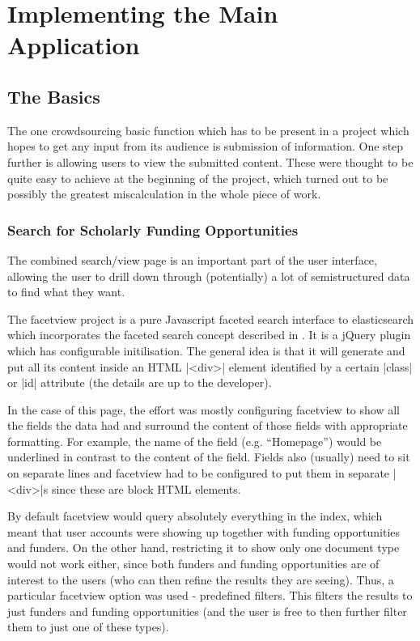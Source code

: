 \section{Implementing the Main Application}

\subsection{The Basics}
\label{impl-hard-basics}

The one crowdsourcing basic function which has to be present in a project which hopes to get any input from its audience is submission of information. One step further is allowing users to view the submitted content. These were thought to be quite easy to achieve at the beginning of the project, which turned out to be possibly the greatest miscalculation in the whole piece of work.

\subsubsection{Search for Scholarly Funding Opportunities}
\label{impl-facetview}
\label{impl-search}
The combined search/view page is an important part of the user interface, allowing the user to drill down through (potentially) a lot of semistructured data to find what they want.

The facetview project is a pure Javascript faceted search interface to elasticsearch which incorporates the faceted search concept described in . It is a jQuery plugin which has configurable initilisation. The general idea is that it will generate and put all its content inside an HTML |<div>| element identified by a certain |class| or |id| attribute (the details are up to the developer).

In the case of this page, the effort was mostly configuring facetview to show all the fields the data had and surround the content of those fields with appropriate formatting. For example, the name of the field (e.g. ``Homepage'') would be underlined in contrast to the content of the field. Fields also (usually) need to sit on separate lines and facetview had to be configured to put them in separate |<div>|s since these are block HTML elements.

By default facetview would query absolutely everything in the index, which meant that user accounts were showing up together with funding opportunities and funders. On the other hand, restricting it to show only one document type would not work either, since both funders and funding opportunities are of interest to the users (who can then refine the results they are seeing). Thus, a particular facetview option was used - predefined filters. This filters the results to just funders and funding opportunities (and the user is free to then further filter them to just one of these types).

